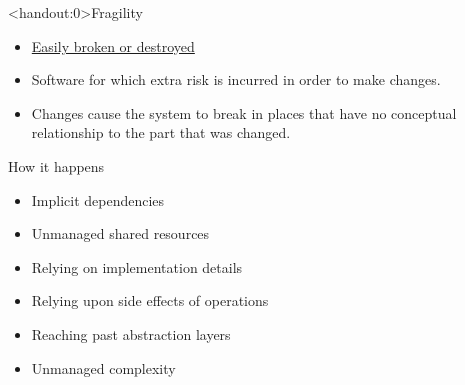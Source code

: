 \documentclass[xcolor=svgnames]{beamer}
\begin{document}

{%
%
\begin{frame}<handout:0>{Fragility}
\end{frame}
}

{%
%
\begin{frame}{\subsecname}

    \begin{itemize}
        \item \href{https://www.merriam-webster.com/dictionary/fragile}
            {Easily broken or destroyed} \pause
        \item Software for which extra risk is incurred in order to make
            changes. \pause
        \item Changes cause the system to break in places that have no
            conceptual relationship to the part that was changed.
    \end{itemize}
\end{frame}
}


{%
%
\begin{frame}{\subsecname}

    How it happens
    \begin{itemize}
        \pause \item Implicit dependencies
        \pause \item Unmanaged shared resources
        \pause \item Relying on implementation details
        \pause \item Relying upon side effects of operations
        \pause \item Reaching past abstraction layers
        \pause \item Unmanaged complexity
    \end{itemize}
\end{frame}
}

\end{document}
